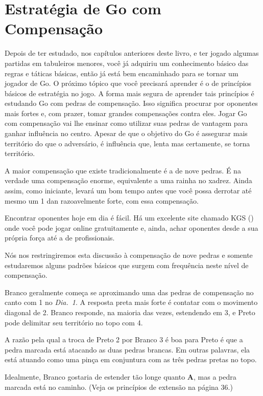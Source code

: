 \chapter{Estratégia de Go com Compensação}\label{chap:estrat_comp}

Depois de ter estudado, nos capítulos anteriores deste livro, e ter jogado algumas partidas em tabuleiros menores, você já adquiriu um conhecimento básico das regras e táticas básicas, então já está bem encaminhado para se tornar um jogador de Go. O próximo tópico que você precisará aprender é o de princípios básicos de estratégia no jogo. A forma mais segura de aprender tais princípios é estudando Go com pedras de compensação. Isso significa procurar por oponentes mais fortes e, com prazer, tomar grandes compensações contra eles. Jogar Go com compensação vai lhe ensinar como utilizar suas pedras de vantagem para ganhar influência no centro. Apesar de que o objetivo do Go é assegurar mais território do que o adversário, é influência que, lenta mas certamente, se torna território.

A maior compensação que existe tradicionalmente é a de nove pedras. É na verdade uma compensação enorme, equivalente a uma rainha no xadrez. Ainda assim, como iniciante, levará um bom tempo antes que você possa derrotar até mesmo um 1 dan razoavelmente forte, com essa compensação.

Encontrar oponentes hoje em dia é fácil. Há um excelente site chamado KGS (\href{https://www.gokgs.com}{})~\cite{kgs} onde você pode jogar online gratuitamente e, ainda, achar oponentes desde a sua própria força até a de profissionais.

Nós nos restringiremos esta discussão à compensação de nove pedras e somente estudaremos alguns padrões básicos que surgem com frequência neste nível de compensação.

\pagebreak

Branco geralmente começa se aproximando uma das pedras de compensação no canto com 1 no \emph{Dia.\@~1}. A resposta preta mais forte é contatar com o movimento diagonal de 2. Branco responde, na maioria das vezes, estendendo em 3, e Preto pode delimitar seu território no topo com 4.

A razão pela qual a troca de Preto 2 por Branco 3 é boa para Preto é que a pedra marcada está atacando as duas pedras brancas. Em outras palavras, ela está atuando como uma pinça em conjuntura com as três pedras pretas no topo.

Idealmente, Branco gostaria de estender tão longe quanto \textbf{A}, mas a pedra marcada está no caminho. (Veja os princípios de extensão na página 36.)

